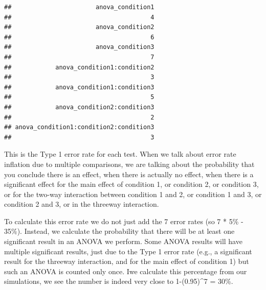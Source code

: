 \documentclass[]{book}
\newenvironment{Shaded}{\begin{snugshade}}{\end{snugshade}}
\newcommand{\ControlFlowTok}[1]{\textcolor[rgb]{0.13,0.29,0.53}{\textbf{#1}}}
\newcommand{\DecValTok}[1]{\textcolor[rgb]{0.00,0.00,0.81}{#1}}
\newcommand{\KeywordTok}[1]{\textcolor[rgb]{0.13,0.29,0.53}{\textbf{#1}}}
\newcommand{\NormalTok}[1]{#1}
\newcommand{\OperatorTok}[1]{\textcolor[rgb]{0.81,0.36,0.00}{\textbf{#1}}}
\newcommand{\StringTok}[1]{\textcolor[rgb]{0.31,0.60,0.02}{#1}}
\begin{document}
\begin{verbatim}
##                       anova_condition1 
##                                      4 
##                       anova_condition2 
##                                      6 
##                       anova_condition3 
##                                      7 
##            anova_condition1:condition2 
##                                      3 
##            anova_condition1:condition3 
##                                      5 
##            anova_condition2:condition3 
##                                      2 
## anova_condition1:condition2:condition3 
##                                      3
\end{verbatim}

This is the Type 1 error rate for each test. When we talk about error rate inflation due to multiple comparisons, we are talking about the probability that you conclude there is an effect, when there is actually no effect, when there is a significant effect for the main effect of condition 1, or condition 2, or condition 3, or for the two-way interaction between condition 1 and 2, or condition 1 and 3, or condition 2 and 3, or in the threeway interaction.

To calculate this error rate we do not just add the 7 error rates (so 7 * 5\% - 35\%). Instead, we calculate the probability that there will be at least one significant result in an ANOVA we perform. Some ANOVA results will have multiple significant results, just due to the Type 1 error rate (e.g., a significant result for the threeway interaction, and for the main effect of condition 1) but such an ANOVA is counted only once. Iwe calculate this percentage from our simulations, we see the number is indeed very close to 1-(0.95)\^{}7 = 30\%.

\begin{Shaded}
\end{Shaded}
\end{document}
